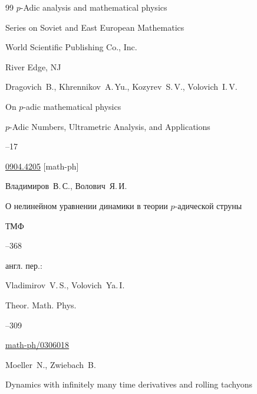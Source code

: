 \begin{thebibliography}{99}
\book $p$-Adic analysis and mathematical physics

\serial Series on Soviet and East European Mathematics


\publ World Scientific Publishing Co., Inc.

\publaddr River Edge, NJ








\by  Dragovich~B., Khrennikov~A.\,Yu., Kozyrev~S.\,V., Volovich~I.\,V.

\paper On $p$-adic mathematical physics

\jour $p$-Adic Numbers, Ultrametric Analysis, and Applications




--17

\arxiv \href{http://arxiv.org/abs/0904.4205}{0904.4205} [math-ph]




\by Владимиров~В.\,С., Волович~Я.\,И.

\paper О нелинейном уравнении динамики в теории $p$-адической струны

\jour ТМФ




--368

\transl

англ. пер.:~

\by Vladimirov~V.\,S.,  Volovich~Ya.\,I.

\jour Theor. Math. Phys.




--309

\arxiv \href{http://arxiv.org/abs/math-ph/0306018}{math-ph/0306018}






\by   Moeller~N., Zwiebach~B.

\paper Dynamics with infinitely many time derivatives and rolling tachyons


\end{thebibliography}
